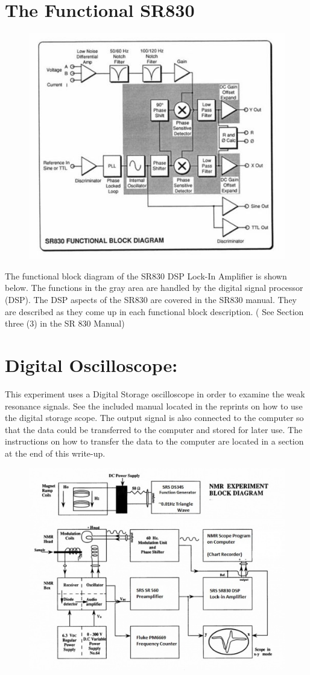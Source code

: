 \documentclass{../lab}
\begin{document}
\section{The Functional SR830}


\begin{figure}[h]
    \centering
    \href{http://experimentationlab.berkeley.edu/sites/default/files/images/500px-NMR34.jpg}{\includegraphics[width=0.5\linewidth]{images/500px-NMR34.jpg}}
    \caption{}
    \label{fig:500px-NMR34}
\end{figure}

The functional block diagram of the SR830 DSP Lock-In Amplifier is shown below. The functions in the gray area are handled by the digital signal processor (DSP). The DSP aspects of the SR830 are covered in the SR830 manual. They are described as they come up in each functional block description. ( See Section three (3) in the SR 830 Manual)

\section{Digital Oscilloscope:}

This experiment uses a Digital Storage oscilloscope in order to examine the weak resonance signals. See the included manual located in the reprints on how to use the digital storage scope. The output signal is also connected to the computer so that the data could be transferred to the computer and stored for later use. The instructions on how to transfer the data to the computer are located in a section at the end of this write-up.

\begin{figure}[h]
    \centering
    \href{http://experimentationlab.berkeley.edu/sites/default/files/images/500px-NMRblockdiagram.jpg}{\includegraphics[width=0.5\linewidth]{images/500px-NMRblockdiagram.jpg}}
    \caption{}
    \label{fig:500px-NMRblockdiagram}
\end{figure}
\end{document}
